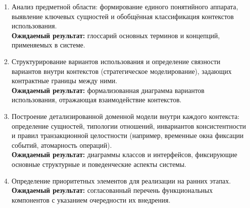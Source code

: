 \begin{enumerate}
    \item Анализ предметной области: формирование единого понятийного
    аппарата, выявление ключевых сущностей и обобщённая классификация
    контекстов использования. \\
    \textbf{Ожидаемый результат:} глоссарий основных терминов и концепций,
    применяемых в системе.
    
    \item Структурирование вариантов использования и определение
    связности вариантов внутри контекстов (стратегическое моделирование), задающих
    контрактные границы между ними. \\
    \textbf{Ожидаемый результат:} формализованная диаграмма вариантов
    использования, отражающая взаимодействие контекстов.
    
    \item Построение детализированной доменной модели внутри каждого
    контекста: определение сущностей, типологии отношений, инвариантов
    консистентности и правил транзакционной целостности (например,
    временные окна фиксации событий, атомарность операций). \\
    \textbf{Ожидаемый результат:} диаграммы классов и интерфейсов,
    фиксирующие основные структурные и поведенческие аспекты системы.
    
    \item Определение приоритетных элементов для реализации на ранних
    этапах. \\
    \textbf{Ожидаемый результат:} согласованный перечень функциональных
    компонентов с указанием очередности их внедрения.
\end{enumerate}

